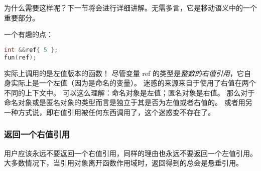 \documentclass[../../LearnCpp.tex]{subfiles}
\begin{document}
为什么需要这样呢？下一节将会进行详细讲解。无需多言，它是移动语义中的一个重要部分。

一个有趣的点：

\begin{lstlisting}[language=C++]
int &&ref{ 5 };
fun(ref);
\end{lstlisting}

实际上调用的是左值版本的函数！
尽管变量 ref 的类型是\textit{整数的右值引用}，它自身实际上是一个左值（因为是命名的变量）。
迷惑的来源来自于使用了右值在两个不同的上下文中。
可以这么理解：命名对象是左值；匿名对象是右值。
那么对于命名对象或是匿名对象的类型而言是独立于其是否为左值或者右值的。
或者用另一种方式说，即右值引用被任何东西调用了，这个迷惑变不存在了。

\subsubsection*{返回一个右值引用}

用户应该永远不要返回一个右值引用，同样的理由也永远不要返回一个左值引用。
大多数情况下，当引用对象离开函数作用域时，返回得到的总会是悬垂引用。
\end{document}
